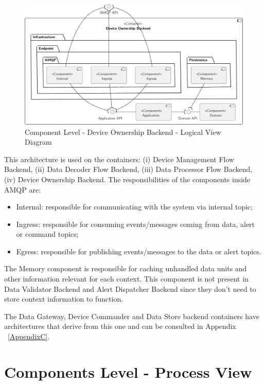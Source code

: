 \begin{figure}[H]
   \centering
   \includegraphics[page=1,width=\columnwidth]{assets/diagrams/design/architectural/level3/logical/device-ownership-backend.pdf}
   \caption[Component Level - Device Ownership Backend - Logical View Diagram]{Component Level - Device Ownership Backend - Logical View Diagram}
   \label{fig:design:architecture:platform:component:logical:diagram:ownership}
\end{figure}

This architecture is used on the containers: (i) Device Management Flow Backend, (ii) Data Decoder Flow Backend, (iii) Data Processor Flow Backend, (iv) Device Ownership Backend. The responsibilities of the components inside AMQP are:

\begin{itemize}
   \item Internal: responsible for communicating with the system via internal topic;
   \item Ingress: responsible for consuming events/messages coming from data, alert or command topics;
   \item Egress: responsible for publishing events/messages to the data or alert topics.
\end{itemize}

The Memory component is responsible for caching unhandled data units and other information relevant for each context. This component is not present in Data Validator Backend and Alert Dispatcher Backend since they don't need to store context information to function.

The Data Gateway, Device Commander and Data Store backend containers have architectures that derive from this one and can be consulted in Appendix ~\ref{AppendixC}.

\section{Components Level - Process View}
\label{par:design:architecture:platform:components:process}

